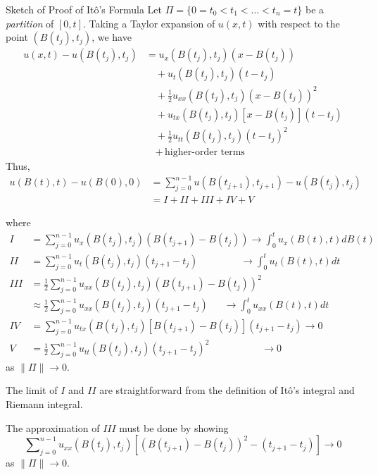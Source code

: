 \documentclass[letterpaper,handout]{beamer}
\def\Sum{\sum\nolimits}
\begin{document}
\begin{frame}{Sketch of Proof of It\^{o}'s Formula}
Let $\Pi =\{0=t_0<t_1<\ldots<t_n=t\}$ be a {\em partition} of $[0,t]$.
Taking a Taylor expansion of $u(x,t)$ with respect to the point $(B(t_j),t_j)$,
we have
\begin{align*}
u(x,t)-u(B(t_j),t_j)&=u_x(B(t_j),t_j)(x-B(t_j))\\
&\quad+u_t(B(t_j),t_j)(t-t_j)\\
&\quad+\frac{1}{2}u_{xx}(B(t_j),t_j)(x-B(t_j))^2\\
&\quad+u_{tx}(B(t_j),t_j)[x-B(t_j)](t-t_j)\\
&\quad+\frac{1}{2}u_{tt}(B(t_j),t_j)(t-t_j)^2\\
&\quad+\,\mbox{higher-order terms}
\end{align*}
Thus,
\begin{align*}
u(B(t),t)-u(B(0),0)&=\Sum_{j=0}^{n-1}u(B(t_{j+1}),t_{j+1})-u(B(t_j),t_j)\\
&=I+II+III+IV+V
\end{align*}
\end{frame}
\begin{frame}
where
\begin{align*}
I&=\Sum_{j=0}^{n-1}u_x(B(t_j),t_j)(B(t_{j+1})-B(t_j))\longrightarrow \int_0^t u_x(B(t),t)dB(t)\\
II&=\Sum_{j=0}^{n-1}u_t(B(t_j),t_j)(t_{j+1}-t_j)\qquad\qquad\;\longrightarrow \int_0^t u_t(B(t),t)dt\\
III&=\frac{1}{2}\Sum_{j=0}^{n-1}u_{xx}(B(t_j),t_j)(B(t_{j+1})-B(t_j))^2\\
   &\approx\frac{1}{2}\Sum_{j=0}^{n-1}u_{xx}(B(t_j),t_j)(t_{j+1}-t_j)\quad\;\;\longrightarrow \int_0^t u_{xx}(B(t),t)dt\\
IV&=\Sum_{j=0}^{n-1}u_{tx}(B(t_j),t_j)[B(t_{j+1})\!-\!B(t_j)](t_{j+1}\!-\!t_j)\longrightarrow 0\\
V&=\frac{1}{2}\Sum_{j=0}^{n-1}u_{tt}(B(t_j),t_j)(t_{j+1}-t_j)^2\qquad\qquad\quad\;\longrightarrow 0
\end{align*}
as $\|\Pi\|\to 0$.
\end{frame}
\begin{frame}
The limit of $I$ and $II$ are straightforward from the definition of It\^{o}'s integral and Riemann integral.

The approximation of $III$ must be done by showing
$$\Sum_{j=0}^{n-1}u_{xx}(B(t_j),t_j)[(B(t_{j+1})-B(t_j))^2-(t_{j+1}-t_j)]\to 0$$
as $\|\Pi\|\to 0$.
\end{frame}
\end{document}
